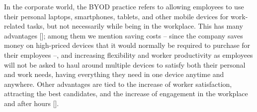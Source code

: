 In the corporate world, the BYOD
practice refers to allowing employees to use their
personal laptops, smartphones, tablets, and other mobile devices
for work-related tasks, but not necessarily while being in the workplace. This has many
advantages [\cite{singh2012byod}]; among them we mention saving costs --
since the company saves money on high-priced devices that
it would normally be required to purchase for their employees --, and
increasing flexibility and worker productivity as employees will not
be asked to haul around multiple devices to satisfy both their personal and
work needs, having everything they need in one device anytime and
anywhere. 
Other advantages are tied to the increase of worker satisfaction, attracting the best candidates, and the increase of engagement in the workplace and after hours [\cite{singh2012byod}]. 


